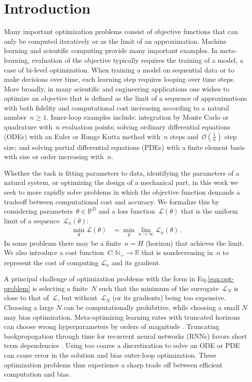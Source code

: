 \section{Introduction}
Many important optimization problems consist of objective functions that can only be computed iteratively or as the limit of an approximation.
Machine learning and scientific computing provide many important examples.
In meta-learning, evaluation of the objective typically requires the training of a model, a case of bi-level optimization.
When training a model on sequential data or to make decisions over time, each learning step requires looping over time steps.
More broadly, in many scientific and engineering applications one wishes to optimize an objective that is defined as the limit of a sequence of approximations with both fidelity and computational cost increasing according to a natural number~${n\geq 1}$.
Inner-loop examples include: integration by Monte Carlo or quadrature with~$n$ evaluation points; solving ordinary differential equations (ODEs) with an Euler or Runge Kutta method with~$n$ steps and~$\mathcal{O}(\frac{1}{n})$ step size;
and solving partial differential equations (PDEs) with a finite element basis with size or order increasing with~$n$.

Whether the task is fitting parameters to data, identifying the parameters of a natural system, or optimizing the design of a mechanical part, in this work we seek to more rapidly solve problems in which the objective function demands a tradeoff between computational cost and accuracy.
We formalize this by considering parameters~$\theta\in\mathbb{R}^D$ and a loss function~$\mathcal{L}(\theta)$ that is the uniform limit of a sequence~$\mathcal{L}_n(\theta)$:
\begin{align}
\min_\theta \mathcal{L}(\theta) &= \min_\theta\lim_{n\to\infty}\mathcal{L}_n(\theta)\,.
\label{eqn:opt-problem}
\end{align}
In some problems there may be a finite~${n=H}$ (horizon) that achieves the limit.
We also introduce a cost function~${C:\mathbb{N}_{+}\to\mathbb{R}}$ that is nondecreasing in~$n$ to represent the cost of computing $\mathcal{L}_n$ and its gradient.

A principal challenge of optimization problems with the form in Eq.\ref{eqn:opt-problem} is selecting a finite~$N$ such that the minimum of the surrogate~$\mathcal{L}_N$ is close to that of~$\mathcal{L}$, but without~$\mathcal{L}_N$ (or its gradients) being too expensive.
Choosing a large $N$ can be computationally prohibitive, while choosing a small $N$ may bias optimization.
Meta-optimizing learning rates with truncated horizons can choose wrong hyperparameters by orders of magnitude \cite{wu2018understanding}.
Truncating backpropogation through time for recurrent neural networks (RNNs) favors short term dependencies \cite{tallec2017unbiasing}.
Using too coarse a discretization to solve an ODE or PDE can cause error in the solution and bias outer-loop optimization.
These optimization problems thus experience a sharp trade off between efficient computation and bias.

